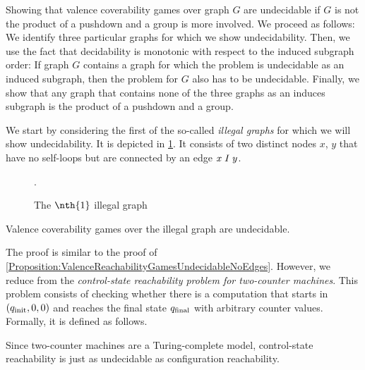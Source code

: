 \documentclass[../../diss.tex]{subfiles}
\begin{document}
Showing that valence coverability games over graph $G$ are undecidable if $G$ is not the product of a pushdown and a group is more involved.
We proceed as follows:
We identify three particular graphs for which we show undecidability.
Then, we use the fact that decidability is monotonic with respect to the induced subgraph order:
If graph $G$ contains a graph for which the problem is undecidable as an induced subgraph, then the problem for $G$ also has to be undecidable.
Finally, we show that any graph that contains none of the three graphs as an induces subgraph is the product of a pushdown and a group.

We start by considering the first of the so-called \emph{illegal graphs} for which we will show undecidability.
It is depicted in \cref{Figure:ValenceCoverabilityGamesUndecidableOne}.
It consists of two distinct nodes $x$, $y$ that have no self-loops but are connected by an edge $x \mathrel{I} y$.

\begin{figure}[t]
    \centering%
    \caption{The $\nth{1}$ illegal graph}.%
    \label{Figure:ValenceCoverabilityGamesUndecidableOne}%
\end{figure}

\begin{lemma}%
\label{Lemma:ValenceCoverabilityGamesUndecidableOne}%
    Valence coverability games over the  illegal graph are undecidable.
\end{lemma}

The proof is similar to the proof of \cref{Proposition:ValenceReachabilityGamesUndecidableNoEdges}.
However, we reduce from the \emph{control-state reachability problem for two-counter machines}.
This problem consists of checking whether there is a computation that starts in $(q_{\text{init}},0,0)$ and reaches the final state $q_{\text{final}}$ with arbitrary counter values.
Formally, it is defined as follows.

\begin{problem}
\end{problem}

Since two-counter machines are a Turing-complete model, control-state reachability is just as undecidable as configuration reachability.
\end{document}
